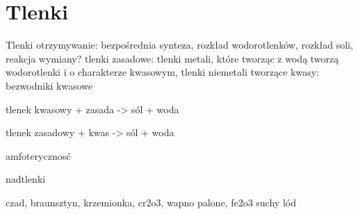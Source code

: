\section{Tlenki}


Tlenki
otrzymywanie: bezpośrednia synteza, rozkład wodorotlenków, rozkład soli, reakcja wymiany?
tlenki zasadowe: tlenki metali, które tworząc z wodą tworzą wodorotlenki i o charakterze kwasowym,
tlenki niemetali tworzące kwasy: bezwodniki kwasowe

tlenek kwasowy + zasada -> sól + woda

tlenek zasadowy + kwas -> sól + woda

amfoterycznosć

nadtlenki

czad, braunsztyn, krzemionka, cr2o3, wapno palone, fe2o3 suchy lód

